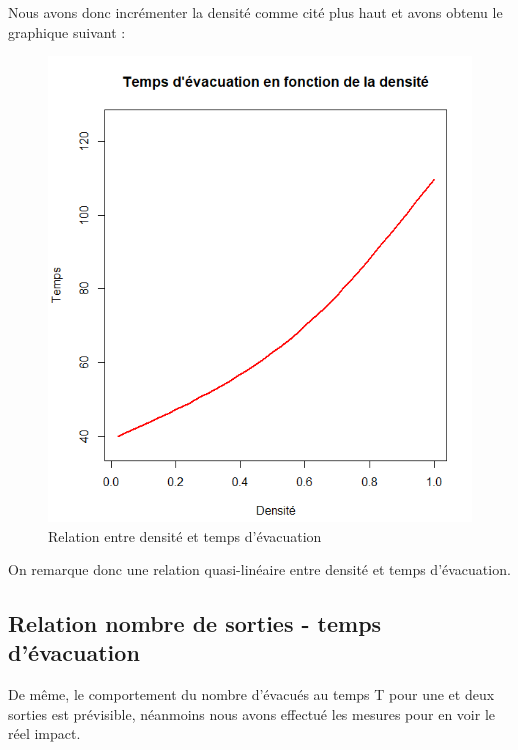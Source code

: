 \documentclass{article}
\begin{document}
Nous avons donc incrémenter la densité comme cité plus haut et avons obtenu le graphique suivant : 
\begin{figure}[H]
	\includegraphics[scale=0.35]{densite_temps.PNG}
  \centering
	\caption{Relation entre densité et temps d'évacuation}
 	\label{pic: Densite}
\end{figure}
On remarque donc une relation quasi-linéaire entre densité et temps d'évacuation.

\subsection{Relation nombre de sorties - temps d'évacuation}
De même, le comportement du nombre d'évacués au temps T pour une et deux sorties est prévisible, néanmoins nous avons effectué les mesures pour en voir le réel impact. 
\end{document}
